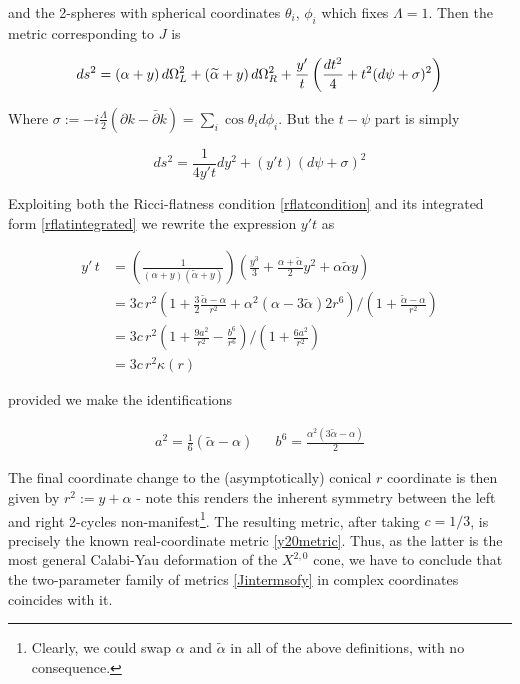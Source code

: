 and the 2-spheres with spherical coordinates $\theta_i$, $\phi_i$ which fixes $\Lambda = 1$. Then the metric corresponding to $J$ is

\begin{equation}
	ds^2 = (\alpha+y)\, d\Omega^2_L + (\widetilde{\alpha} + y) \,d\Omega^2_R + \frac{y'}{t} \left( \frac{dt^2}{4} + t^2 (d\psi + \sigma)^2 \right)
\end{equation}

Where $\sigma := -i\frac{\Lambda}{2}(\partial k - \bar \partial k) = \sum_i \cos\theta_i d\phi_i$. But the $t-\psi$ part is simply

\begin{equation}
	ds^2 = \frac{1}{4y't} dy^2 + (y' t) (d\psi + \sigma)^2
\end{equation}

Exploiting both the Ricci-flatness condition \eqref{rflatcondition} and its integrated form \eqref{rflatintegrated} we rewrite the expression $y't$ as

\begin{align}
	y'\,t & = \left(\frac{1}{(\alpha + y)(\tilde\alpha + y)}\right) \left( \frac{y^3}{3} + \frac{\alpha + \tilde{\alpha}}{2} y^2 + \alpha \tilde{\alpha} y \right)\\
	& = 3c\,r^2 \left(
	{1+ \frac{3}{2} \frac{\tilde{\alpha} - \alpha}{r^2} + {\alpha^{2}(\alpha - 3 \tilde{\alpha})}{2r^6} }
	\right)\bigg/\left({1+ \frac{\tilde{\alpha} -\alpha}{r^2} }\right)\\
	& = 3c\,r^2 \left({1+\frac{9a^2}{r^2} - \frac{b^6}{r^6}}\right)\bigg/\left({1 + \frac{6a^2}{r^2}}\right) \\
	& = 3c\,r^2 \kappa(r)
\end{align}

provided we make the identifications

\begin{align}
	a^2 = \frac{1}{6}(\tilde{\alpha} - \alpha) && b^6 = \frac{\alpha^{2}(3\tilde{\alpha}-\alpha)}2
	\label{}
\end{align}

The final coordinate change to the (asymptotically) conical $r$ coordinate is then given by $r^2 := y + \alpha$ - note this renders the inherent symmetry between the left and right 2-cycles non-manifest\footnote{Clearly, we could swap $\alpha$ and $\tilde{\alpha}$ in all of the above definitions, with no consequence.}. The resulting metric, after taking $c=1/3$, is precisely the known real-coordinate metric \eqref{y20metric}. Thus, as the latter is the most general Calabi-Yau deformation of the $X^{2,0}$ cone, we have to conclude that the two-parameter family of metrics \eqref{Jintermsofy} in complex coordinates coincides with it.

